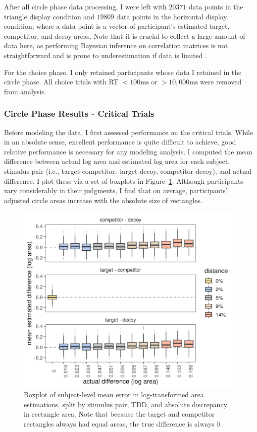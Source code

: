 After all circle phase data processing, I were left with $20371$ data points in the triangle display condition and $19809$ data points in the horizontal display condition, where a data point is a vector of participant's estimated target, competitor, and decoy areas. Note that it is crucial to collect a large amount of data here, as performing Bayesian inference on correlation matrices is not straightforward and is prone to underestimation if data is limited \parencite{martin2021,merkle2023opaque}. 

For the choice phase, I only retained participants whose data I retained in the circle phase. All choice trials with RT $<100\text{ms}$ or $>10,000\text{ms}$ were removed from analysis.

\subsubsection{Circle Phase Results - Critical Trials}
Before modeling the data, I first assessed performance on the critical trials. While in an absolute sense, excellent performance is quite difficult to achieve, good relative performance is necessary for any modeling analysis. I computed the mean difference between actual log area and estimated log area for each subject, stimulus pair (i.e., target-competitor, target-decoy, competitor-decoy), and actual difference. I plot these via a set of boxplots in Figure~\ref{fig:circle_boxplots}. Although participants vary considerably in their judgments, I find that on average, participants' adjusted circle areas increase with the absolute size of rectangles. 


\begin{figure}
   \includegraphics[width=\textwidth]{figures/circleAreaPhase_boxplot_meanlogdiffs_no_outliers.jpeg}
   \caption{Boxplot of subject-level mean error in log-transformed area estimations, split by stimulus pair, TDD, and absolute discrepancy in rectangle area. Note that because the target and competitor rectangles always had equal areas, the true difference is always 0.}
   \label{fig:circle_boxplots}
\end{figure}


